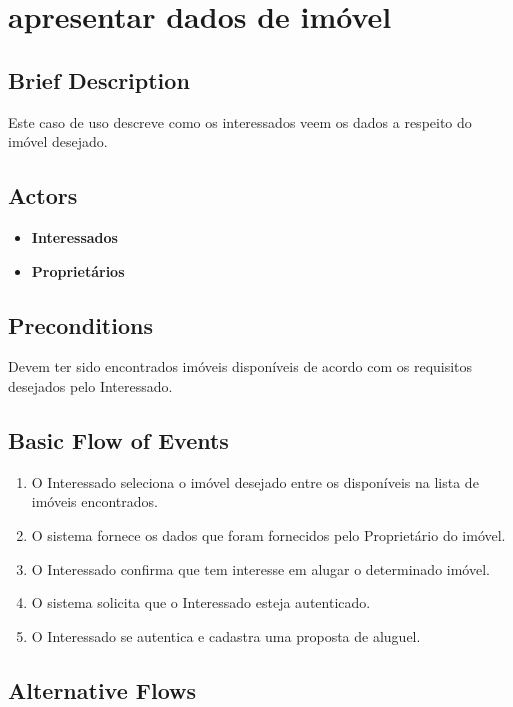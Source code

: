 \section{apresentar dados de imóvel}

\subsection*{Brief Description}
Este caso de uso descreve como os interessados veem os dados a respeito do imóvel desejado.

\subsection*{Actors}

\begin{itemize}
    \item \textbf{Interessados}
    \item \textbf{Proprietários}
\end{itemize}

\subsection*{Preconditions}
 
Devem ter sido encontrados imóveis disponíveis de acordo com os requisitos desejados pelo
Interessado.

\subsection*{Basic Flow of Events}

\begin{enumerate}
    \item O Interessado seleciona o imóvel desejado entre os disponíveis na lista de imóveis encontrados.
    \item O sistema fornece os dados que foram fornecidos pelo Proprietário do imóvel.
    \item O Interessado confirma que tem interesse em alugar o determinado imóvel.
    \item O sistema solicita que o Interessado esteja autenticado.
    \item  O Interessado se autentica e cadastra uma proposta de aluguel.
\end{enumerate}

\subsection*{Alternative Flows}

